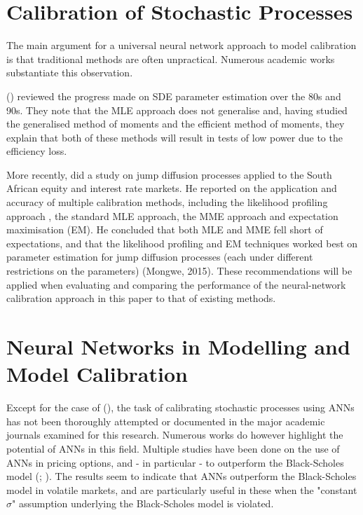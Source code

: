 \documentclass[11pt,oneside,openany,a4paper,english, report, goldenblock
]{usthesis}
\begin{document}
\section{Calibration of Stochastic Processes}
The main argument for a universal neural network approach to model calibration is that traditional methods are often unpractical. Numerous academic works substantiate this observation.


 (\citeyear{Nielsen}) reviewed the progress made on SDE parameter estimation over the 80s and 90s. They note that the MLE approach does not generalise and, having studied the generalised method of moments and the efficient method of moments, they explain that both of these methods will result in tests of low power due to the efficiency loss.


More recently, \citet{Mongwe} did a study on jump diffusion processes applied to the South African equity and interest rate markets. He reported on the application and accuracy of multiple calibration methods, including the likelihood profiling approach \citep{Honore}, the standard MLE approach, the MME approach and expectation maximisation (EM). He concluded that both MLE and MME fell short of expectations, and that the likelihood profiling and EM techniques worked best on parameter estimation for jump diffusion processes (each under different restrictions on the parameters) (Mongwe, 2015). These recommendations will be applied when evaluating and comparing the performance of the neural-network calibration approach in this paper to that of existing methods.


\section{Neural Networks in Modelling and Model Calibration}
Except for the case of  (\citeyear{Xie}), the task of calibrating stochastic processes using ANNs has not been thoroughly attempted or documented in the major academic journals examined for this research. Numerous works do however highlight the potential of ANNs in this field.
Multiple studies have been done on the use of ANNs in pricing options, and - in particular - to outperform the Black-Scholes model (; \citeyear{Yao}). The results seem to indicate that ANNs outperform the Black-Scholes model in volatile markets, and are particularly useful in these when the "constant $\sigma$" assumption underlying the Black-Scholes model is violated.
\end{document}
